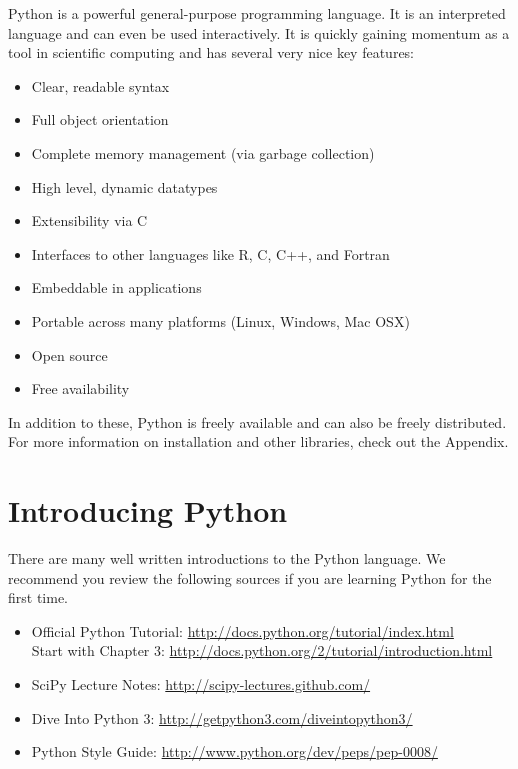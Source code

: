 \label{lab:Essential_Python}

Python is a powerful general-purpose programming language. It is an interpreted
language and can even be used interactively. 
It is quickly gaining momentum as a tool in scientific computing and has several very
nice key features:
\begin{itemize}
\item Clear, readable syntax
\item Full object orientation
\item Complete memory management (via garbage collection)
\item High level, dynamic datatypes
\item Extensibility via C
\item Interfaces to other languages like R, C, C++, and Fortran
\item Embeddable in applications
\item Portable across many platforms (Linux, Windows, Mac OSX)
\item Open source
\item Free availability
\end{itemize}
In addition to these, Python is freely available and can also be freely distributed.
For more information on installation and other libraries, check out the Appendix.


\section*{Introducing Python}
There are many well written introductions to the Python language.
We recommend you review the following sources if you are learning Python for the
first time.

\begin{itemize}
\item Official Python Tutorial: \url{http://docs.python.org/tutorial/index.html} \\
      Start with Chapter 3: \url{http://docs.python.org/2/tutorial/introduction.html}
\item SciPy Lecture Notes: \url{http://scipy-lectures.github.com/}
\item Dive Into Python 3: \url{http://getpython3.com/diveintopython3/}
\item Python Style Guide: \url{http://www.python.org/dev/peps/pep-0008/}
\end{itemize}

